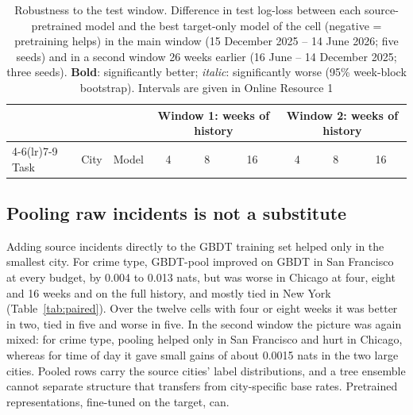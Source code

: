 \documentclass[11pt]{article}
\begin{document}
\begin{table}[!htbp]
\centering
\caption{Robustness to the test window. Difference in test log-loss between each source-pretrained model and the best target-only model of the cell (negative = pretraining helps) in the main window (15 December 2025 -- 14 June 2026; five seeds) and in a second window 26 weeks earlier (16 June -- 14 December 2025; three seeds). \textbf{Bold}: significantly better; \textit{italic}: significantly worse (95\% week-block bootstrap). Intervals are given in Online Resource 1}
\label{tab:window2}
\footnotesize
\setlength{\tabcolsep}{4pt}
\begin{tabular}{lllcccccc}
\toprule
 & & & \multicolumn{3}{c}{Window 1: weeks of history} & \multicolumn{3}{c}{Window 2: weeks of history} \\
\cmidrule(lr){4-6}\cmidrule(lr){7-9}
Task & City & Model & 4 & 8 & 16 & 4 & 8 & 16 \\
\midrule

\bottomrule
\end{tabular}
\end{table}

\subsection{Pooling raw incidents is not a substitute}
Adding source incidents directly to the GBDT training set helped only in the smallest city. For crime type, GBDT-pool improved on GBDT in San Francisco at every budget, by 0.004 to 0.013 nats, but was worse in Chicago at four, eight and 16 weeks and on the full history, and mostly tied in New York (Table~\ref{tab:paired}). Over the twelve cells with four or eight weeks it was better in two, tied in five and worse in five. In the second window the picture was again mixed: for crime type, pooling helped only in San Francisco and hurt in Chicago, whereas for time of day it gave small gains of about 0.0015 nats in the two large cities. Pooled rows carry the source cities' label distributions, and a tree ensemble cannot separate structure that transfers from city-specific base rates. Pretrained representations, fine-tuned on the target, can.
\end{document}
